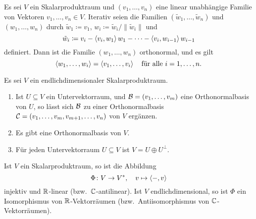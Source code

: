 \begin{theorem}
  Es sei $V$ ein Skalarproduktraum und $(v_1, \dotsc, v_n)$ eine linear unabhängige Familie von Vektoren $v_1, \dotsc, v_n \in V$.
  Iterativ seien die Familien $(\tilde{w}_1, \dotsc, \tilde{w}_n)$ und $(w_1, \dotsc, w_n)$ durch
  $\tilde{w}_1 \coloneqq v_1$, $w_i \coloneqq \tilde{w}_i/\|\tilde{w}_i\|$ und
  \[
    \tilde{w}_i \coloneqq v_i - \left\langle v_i, w_1 \right\rangle w_1 - \dotsb - \left\langle v_i, w_{i-1} \right\rangle w_{i-1}
  \]
  definiert.
  Dann ist die Familie $(w_1, \dotsc, w_n)$ orthonormal, und es gilt
  \[
    \left\langle w_1, \dotsc, w_i \right\rangle = \left\langle v_1, \dotsc, v_i \right\rangle
    \quad
    \text{für alle $i = 1, \dotsc, n$}.
  \]
\end{theorem}


\begin{corollary}
  Es sei $V$ ein endlichdimensionaler Skalarproduktraum.
  \begin{enumerate}[leftmargin=*]
    \item
      Ist $U \subseteq V$ ein Untervektorraum, und $\mathcal{B} = (v_1, \dotsc, v_m)$ eine Orthonormalbasis von $U$, so lässt sich $\mathcal{B}$ zu einer Orthonormalbasis $\mathcal{C} = (v_1, \dotsc, v_m, v_{m+1}, \dotsc, v_n)$ von $V$ ergänzen.
    \item
      Es gibt eine Orthonormalbasis von $V$.
    \item
      Für jeden Untervektorraum $U \subseteq V$ ist $V = U \oplus U^\perp$.
  \end{enumerate}
\end{corollary}


\begin{proposition}
  Ist $V$ ein Skalarproduktraum, so ist die Abbildung
  \[
    \Phi \colon V \to V^*,
    \quad
    v \mapsto \left\langle -, v \right\rangle
  \]
  injektiv und $\mathbb{R}$-linear (bzw.\ $\mathbb{C}$-antilinear).
  Ist $V$ endlichdimensional, so ist $\Phi$ ein Isomorphismus von $\mathbb{R}$-Vektorräumen (bzw.\ Antiisomorphismus von $\mathbb{C}$-Vektorräumen).
\end{proposition}
















